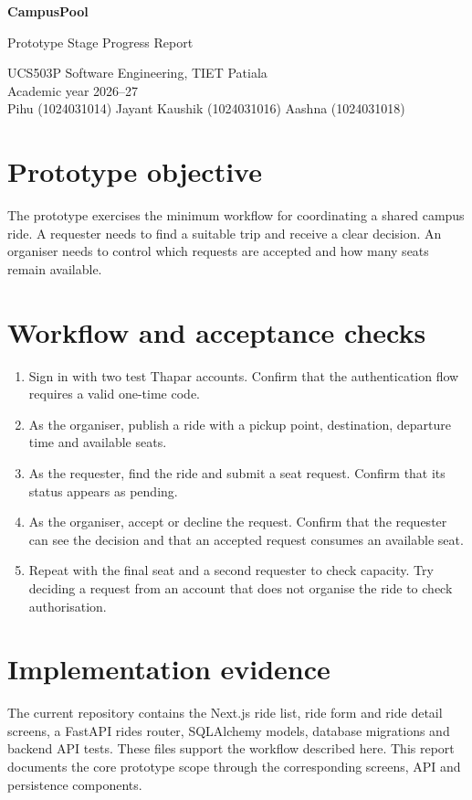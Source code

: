 \documentclass[10pt,a4paper]{article}
\begin{document}
\begin{center}
{\LARGE\bfseries CampusPool\par}
\vspace{4pt}
{\large Prototype Stage Progress Report\par}
\vspace{4pt}
UCS503P Software Engineering, TIET Patiala\\
Academic year 2026--27 \\[4pt]
Pihu (1024031014) \quad Jayant Kaushik (1024031016) \quad Aashna (1024031018)
\end{center}

\section{Prototype objective}
The prototype exercises the minimum workflow for coordinating a shared campus ride. A requester needs to find a suitable trip and receive a clear decision. An organiser needs to control which requests are accepted and how many seats remain available.

\section{Workflow and acceptance checks}
\begin{enumerate}
\item Sign in with two test Thapar accounts. Confirm that the authentication flow requires a valid one-time code.
\item As the organiser, publish a ride with a pickup point, destination, departure time and available seats.
\item As the requester, find the ride and submit a seat request. Confirm that its status appears as pending.
\item As the organiser, accept or decline the request. Confirm that the requester can see the decision and that an accepted request consumes an available seat.
\item Repeat with the final seat and a second requester to check capacity. Try deciding a request from an account that does not organise the ride to check authorisation.
\end{enumerate}

\section{Implementation evidence}
The current repository contains the Next.js ride list, ride form and ride detail screens, a FastAPI rides router, SQLAlchemy models, database migrations and backend API tests. These files support the workflow described here. This report documents the core prototype scope through the corresponding screens, API and persistence components.
\end{document}
